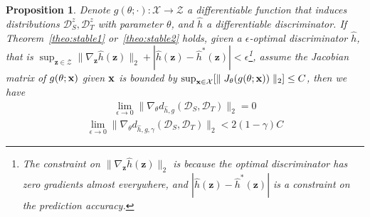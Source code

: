 \documentclass{article} \usepackage{iclr2023_conference,times}
\newtheorem{prop}{Proposition}
\newcommand{\z}{\mathbf{z}}
\newcommand{\D}{\mathcal{D}}
\begin{document}
\begin{prop}
Denote $g(\theta;\cdot):\mathcal{X}\rightarrow\mathcal{Z}$ a differentiable function that induces distributions $\D^z_S,\D^z_T$ with parameter $\theta$, and $\hat{h}$ a differentiable discriminator. If Theorem~\ref{theo:stable1} or~\ref{theo:stable2} holds, given a $\epsilon$-optimal discriminator $\hat{h}$, that is $\sup_{\z\in\mathcal{Z}}\parallel \nabla_\z\hat{h}(\z)\parallel_2+|\hat{h}(\z)-\hat{h}^*(\z)|<\epsilon$\footnote{The constraint on $\parallel \nabla_\z\hat{h}(\z)\parallel_2$ is because the optimal discriminator has zero gradients almost everywhere, and $|\hat{h}(\z)-\hat{h}^*(\z)|$ is a constraint on the prediction accuracy.}, assume the Jacobian matrix of $g(\theta;\mathbf{x})$ given $\mathbf{x}$ is bounded by $\sup_{\mathbf{x}\in\mathcal{X}}[\parallel J_\theta(g(\theta;\mathbf{x}))\parallel_2]\leq C $, then we have 
\begin{equation}
\begin{aligned}
\lim_{\epsilon\rightarrow0}\parallel\nabla_\theta d_{\hat{h},g}(\D_S,\D_T) \parallel_2=0
\end{aligned}\end{equation}
\begin{equation}
\begin{aligned}
\lim_{\epsilon\rightarrow0} \parallel\nabla_\theta d_{\hat{h},g,\gamma}(\D_S,\D_T) \parallel_2<2(1-\gamma)C
\end{aligned}\end{equation}
\label{prop:stable}
\end{prop}
\end{document}
